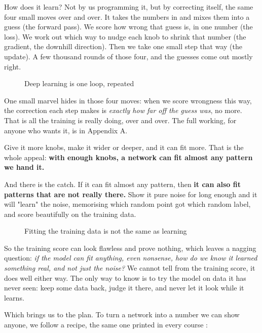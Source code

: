 \documentclass[11pt]{article} %
\begin{document}
How does it learn? Not by us programming it, but by correcting itself, the same four small moves over and over. It takes the numbers in and mixes them into a guess (the forward pass). We score how wrong that guess is, in one number (the loss). We work out which way to nudge each knob to shrink that number (the gradient, the downhill direction). Then we take one small step that way (the update). A few thousand rounds of those four, and the guesses come out mostly right.

\begin{figure}[htbp]
\centering

\caption{Deep learning is one loop, repeated}
\end{figure}


One small marvel hides in those four moves: when we score wrongness this way, the correction each step makes is \emph{exactly how far off the guess was}, no more. That is all the training is really doing, over and over. The full working, for anyone who wants it, is in Appendix A.

Give it more knobs, make it wider or deeper, and it can fit more. That is the whole appeal: \textbf{with enough knobs, a network can fit almost any pattern we hand it.}

And there is the catch. If it can fit almost any pattern, then \textbf{it can also fit patterns that are not really there.} Show it pure noise for long enough and it will "learn" the noise, memorising which random point got which random label, and score beautifully on the training data.

\begin{figure}[htbp]
\centering

\caption{Fitting the training data is not the same as learning}
\end{figure}


So the training score can look flawless and prove nothing, which leaves a nagging question: \emph{if the model can fit anything, even nonsense, how do we know it learned something real, and not just the noise?} We cannot tell from the training score, it does well either way. The only way to know is to try the model on data it has never seen: keep some data back, judge it there, and never let it look while it learns.

Which brings us to the plan. To turn a network into a number we can show anyone, we follow a recipe, the same one printed in every course \cite{goodfellow:2016,chollet:2018}:
\end{document}
